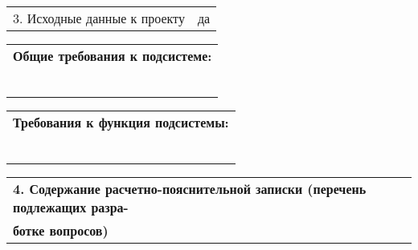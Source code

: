 \documentclass[12pt, А4]{article} %
\begin{document}
\begin{FlushLeft}
    \begin{tabular}{p{6.9cm} p{9.95cm}} %
        \textsf{3. Исходные данные к проекту} &
        \textsf{да} \vspace{1pt} \hline
    \end{tabular} %

    \begin{tabular}{p{17.25cm}} %
        \textsf{\textbf{Общие требования к подсистеме:}} \vspace{1pt} \hline \\
        \vspace{1pt} \hline \\
        \vspace{1pt} \hline \\
        \vspace{1pt} \hline \\
        \vspace{1pt} \hline \\
        \vspace{1pt} \hline \\
        \vspace{1pt} \hline 
    \end{tabular} %

    \begin{tabular}{p{17.25cm}} %
        \textsf{\textbf{Требования к функция подсистемы:}} \vspace{1pt} \hline \\
        \vspace{1pt} \hline \\
        \vspace{1pt} \hline \\
        \vspace{1pt} \hline \\
        \vspace{1pt} \hline \\
        \vspace{1pt} \hline \\
        \vspace{1pt} \hline 
    \end{tabular} %

    \begin{tabular}{p{17.25cm}} %
        \textsf{\textbf{4. Содержание расчетно-пояснительной записки (перечень подлежащих разра-}} \vspace{1pt} \hline \\
        \textsf{\textbf{ботке вопросов)}} \vspace{1pt} \hline \\
    \end{tabular} %
    

\end{FlushLeft}
\end{document}
